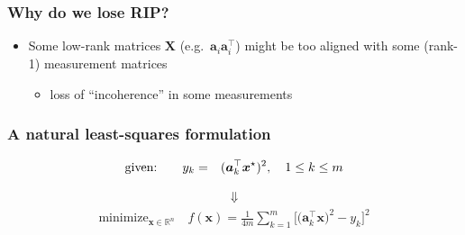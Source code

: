 \documentclass[compress,
mathserif,wide,%
]{beamer}
\begin{document}
\begin{frame}
\frametitle{Why do we lose RIP?} 


\begin{itemize}
  \itemsep1em 
  \item Some low-rank matrices $\bm{X}$ (e.g.~$\bm{a}_i\bm{a}_i^{\top}$) might be too aligned with some (rank-1) measurement matrices 
  \vspace{0.3em}
  \begin{itemize}
    \item loss of ``incoherence'' in some measurements
  \end{itemize}
\end{itemize}

\end{frame}





\begin{frame}
\frametitle{A natural least-squares formulation}

\begin{eqnarray*}
	\text{given:}\qquad y_k &= &(\bm{a}_k^\top\bm{x}^{\star})^2, \quad  1\leq k \leq m  
\end{eqnarray*}

\vspace{-2em}
\begin{align*}
	\Downarrow
\end{align*}
\vspace{-2em}
%
%
\begin{align*} 
	\text{minimize}_{\bm{x}\in \mathbb{R}^n}\quad f(\bm{x})=\frac{1}{4m}\sum_{k=1}^{m}\Big[ \big(\bm{a}_{k}^{\top}\bm{x}\big)^{2}-y_{k} \Big]^{2}
\end{align*}
%
%

\end{frame}
\end{document}
